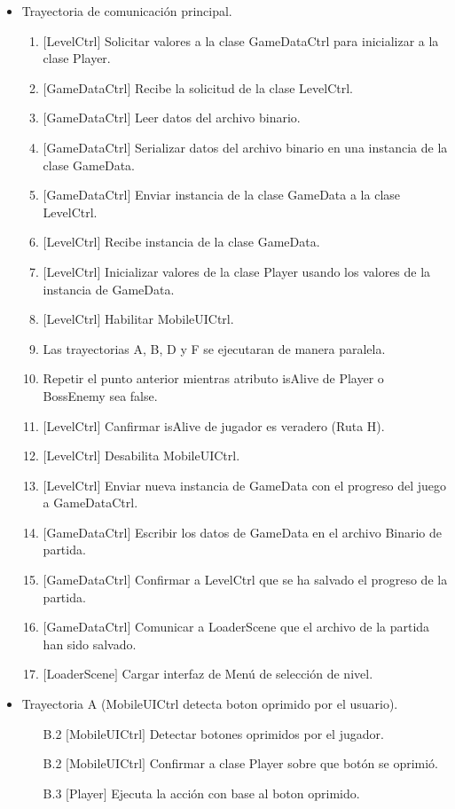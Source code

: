 \begin{itemize}
		\item Trayectoria de comunicación principal.
		\begin{enumerate}
				\item $\lbrack$LevelCtrl$\rbrack$ Solicitar valores a la clase GameDataCtrl 
				para inicializar a la clase Player. 
				\item $\lbrack$GameDataCtrl$\rbrack$ Recibe la solicitud de la clase 
				LevelCtrl.
				\item $\lbrack$GameDataCtrl$\rbrack$ Leer datos del archivo binario.
				\item $\lbrack$GameDataCtrl$\rbrack$ Serializar datos del archivo binario 
				en una instancia de la clase GameData.
				\item $\lbrack$GameDataCtrl$\rbrack$ Enviar instancia de la clase GameData 
				a la clase LevelCtrl.
				\item $\lbrack$LevelCtrl$\rbrack$ Recibe instancia de la clase GameData.
				\item $\lbrack$LevelCtrl$\rbrack$ Inicializar valores de la clase Player 
				usando los valores de la instancia de GameData.
				\item $\lbrack$LevelCtrl$\rbrack$ Habilitar MobileUICtrl.
				\item Las trayectorias A, B, D y F se ejecutaran de manera paralela.
				\item Repetir el punto anterior mientras atributo isAlive de Player o 
				BossEnemy sea false.
				\item $\lbrack$LevelCtrl$\rbrack$ Canfirmar isAlive de jugador es veradero (Ruta H).
 				\item $\lbrack$LevelCtrl$\rbrack$ Desabilita MobileUICtrl.
 				\item $\lbrack$LevelCtrl$\rbrack$ Enviar nueva instancia de GameData con el 
 				progreso del juego a GameDataCtrl.
 				\item $\lbrack$GameDataCtrl$\rbrack$ Escribir los datos de GameData en el archivo
 				Binario de partida.
 				\item $\lbrack$GameDataCtrl$\rbrack$ Confirmar a LevelCtrl que se ha salvado 
 				el progreso de la partida.
 				\item $\lbrack$GameDataCtrl$\rbrack$ Comunicar a LoaderScene que el archivo 
				de la partida han sido salvado.
				\item $\lbrack$LoaderScene$\rbrack$ Cargar interfaz de Menú de selección de 
				nivel.
		\end{enumerate}
		
		\item Trayectoria A (MobileUICtrl detecta boton oprimido por el usuario).
			\begin{enumerate}
				\item[{B.}2] $\lbrack$MobileUICtrl$\rbrack$ Detectar botones oprimidos por el 
				jugador. 
				\item[{B.}2] $\lbrack$MobileUICtrl$\rbrack$ Confirmar a clase Player sobre que 
				botón se oprimió.
				\item[{B.}3] $\lbrack$Player$\rbrack$ Ejecuta la acción con base al boton oprimido.
			\end{enumerate}
			

\end{itemize}
